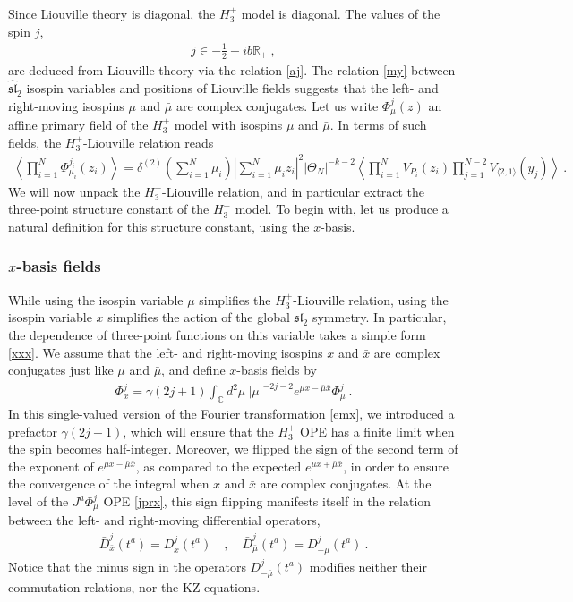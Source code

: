 \documentclass[12pt, a4paper, notitlepage, twoside]{report}
\numberwithin{equation}{section}
\theoremstyle{break}
\begin{document}
Since Liouville theory is diagonal, the $H_3^+$ model is diagonal.
The values of the spin $j$,
\begin{align}
 \boxed{j\in -\frac12 + ib\mathbb{R}_+}\ , 
\end{align}
are deduced from Liouville theory via the relation \eqref{aj}. The relation \eqref{my} between $\widehat{\mathfrak{sl}}_2$ isospin variables and positions of Liouville fields suggests that the left- and right-moving isospins $\mu$ and $\bar\mu$ are complex conjugates. Let us write $\Phi^j_\mu(z)$ an affine primary field of the $H_3^+$ model with isospins $\mu$ and $\bar\mu$. In terms of such fields, the $H_3^+$-Liouville relation reads 
\begin{align}
 \boxed{ \left\langle \prod_{i=1}^N \Phi^{j_i}_{\mu_i}(z_i)\right\rangle 
 = \delta^{(2)}\left({\textstyle\sum_{i=1}^N \mu_i}\right) 
 \left|{\textstyle\sum_{i=1}^N\mu_iz_i}\right|^2 |\Theta_N|^{-k-2} 
 \left\langle \prod_{i=1}^N V_{P_i}(z_i)\prod_{j=1}^{N-2}V_{\langle 2,1\rangle}(y_j)\right\rangle}\ .
\label{dyym} 
\end{align}
We will now unpack the $H_3^+$-Liouville relation, and in particular extract the three-point structure constant of the $H_3^+$ model. 
To begin with, let us produce a natural definition for this structure constant, using the $x$-basis.


\subsubsection{$x$-basis fields}

While using the isospin variable $\mu$ simplifies the $H_3^+$-Liouville relation, using the isospin variable $x$ simplifies the action of the global $\mathfrak{sl}_2$ symmetry. 
In particular, the dependence of three-point functions on this variable takes a simple form \eqref{xxx}.
We assume that the left- and right-moving isospins $x$ and $\bar x$ are complex conjugates just like $\mu$ and $\bar\mu$, and define $x$-basis fields by 
\begin{align}
 \Phi^j_{x} = \gamma(2j+1)\int_{{\mathbb{C}}} d^2\mu\ |\mu|^{-2j-2} e^{\mu x -\bar{\mu}\bar{x}}\Phi^j_{\mu}\ .
\end{align}
In this single-valued version of the Fourier transformation \eqref{emx}, 
we introduced a prefactor $\gamma(2j+1)$, which will ensure that the $H_3^+$ OPE has a finite limit when the spin becomes half-integer.
Moreover, we flipped the sign of the second term of the exponent of $e^{\mu x -\bar{\mu}\bar{x}}$, as compared to the expected $e^{\mu x +\bar{\mu}\bar{x}}$, in order to ensure the convergence of the integral when $x$ and $\bar{x}$ are complex conjugates.
At the level of the $J^a\Phi^j_\mu$ OPE \eqref{jprx}, this sign flipping manifests itself in the relation between the left- and right-moving differential operators,
\begin{align}
 \bar{D}^j_{\bar{x}}(t^a) = D^j_{\bar{x}}(t^a)  \quad , \quad \bar{D}^j_{\bar{\mu}}(t^a) = D^j_{-\bar{\mu}}(t^a)\ . 
\end{align}
Notice that the minus sign in the operators $D^j_{-\bar{\mu}}(t^a)$ modifies neither their commutation relations, nor the KZ equations.
\end{document}
